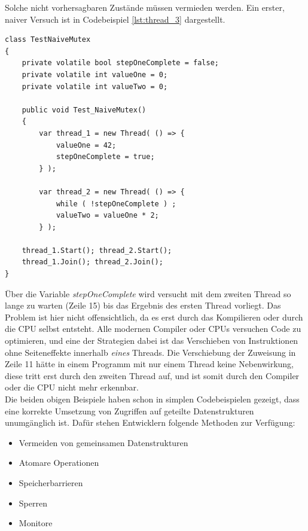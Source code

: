 Solche nicht vorhersagbaren Zustände müssen vermieden werden. Ein erster, naiver Versuch ist in Codebeispiel \ref{lst:thread_3} dargestellt.\parencite[S. 180]{Dahlin2012}
\begin{lstlisting}[caption={Thread naiver Mutex},label={lst:thread_3},captionpos=b]
class TestNaiveMutex
{
    private volatile bool stepOneComplete = false;
	private volatile int valueOne = 0;
	private volatile int valueTwo = 0;

	public void Test_NaiveMutex()
	{
		var thread_1 = new Thread( () => {
			valueOne = 42;
			stepOneComplete = true;
		} );

		var thread_2 = new Thread( () => {
			while ( !stepOneComplete ) ;
			valueTwo = valueOne * 2;
		} );

	thread_1.Start(); thread_2.Start();
	thread_1.Join(); thread_2.Join();
}
\end{lstlisting}
Über die Variable \textit{stepOneComplete} wird versucht mit dem zweiten Thread so lange zu warten (Zeile 15) bis das Ergebnis des ersten Thread vorliegt. Das Problem ist hier nicht offensichtlich, da es erst durch das Kompilieren oder durch die CPU selbst entsteht. Alle modernen Compiler oder CPUs versuchen Code zu optimieren, und eine der Strategien dabei ist das Verschieben von Instruktionen ohne Seiteneffekte innerhalb \textit{eines} Threads\parencite[S. 100]{ecma335}. Die Verschiebung der Zuweisung in Zeile 11 hätte in einem Programm mit nur einem Thread keine Nebenwirkung, diese tritt erst durch den zweiten Thread auf, und ist somit durch den Compiler oder die CPU nicht mehr erkennbar.
\\Die beiden obigen Beispiele haben schon in simplen Codebeispielen gezeigt, dass eine korrekte Umsetzung von Zugriffen auf geteilte Datenstrukturen unumgänglich ist. Dafür stehen Entwicklern folgende Methoden zur Verfügung\parencite[S. 170ff]{tanenbaum2016}:
\begin{itemize}
	\item Vermeiden von gemeinsamen Datenstrukturen
	\item Atomare Operationen
	\item Speicherbarrieren
	\item Sperren
	\item Monitore
\end{itemize}
